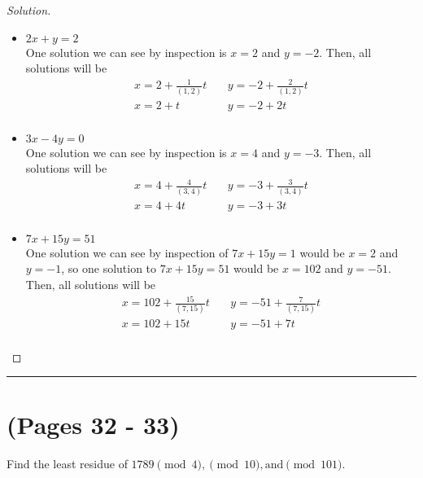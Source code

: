 \documentclass[11pt]{article}
\newcommand{\bline}{\noindent\rule[0.5ex]{\linewidth}{1pt}}
\newenvironment{problem}[2][Problem]{\begin{trivlist}
\item[\hskip \labelsep {\bfseries #1}\hskip \labelsep {\bfseries #2.}]}{\end{trivlist}}
\newenvironment{solution}
  {\renewcommand\qedsymbol{$~$}\begin{proof}[Solution]$ $\par\nobreak\ignorespaces}
  {\end{proof}}
\begin{document}
\begin{solution}
    \begin{itemize}
        \item [(a)] $2x+y=2$ \\
              One solution we can see by inspection is $x=2$ and $y=-2$. Then, all solutions will be
              \begin{align*}
                  x = 2 + \frac{1}{(1,2)}t & ~ & y = -2 + \frac{2}{(1,2)}t \\
                  x = 2 + t                & ~ & y = -2+ 2t                \\
              \end{align*}
        \item [(b)] $3x-4y=0$ \\
              One solution we can see by inspection is $x=4$ and $y=-3$. Then, all solutions will be
              \begin{align*}
                  x = 4 + \frac{4}{(3,4)}t & ~ & y = -3 + \frac{3}{(3,4)}t \\
                  x = 4 + 4t               & ~ & y = -3 + 3t               \\
              \end{align*}
        \item [(c)] $7x+15y=51$ \\
              One solution we can see by inspection of $7x+15y=1$ would be $x=2$ and $y=-1$, so one solution to $7x+15y=51$ would be $x=102$ and $y=-51$. Then, all solutions will be
              \begin{align*}
                  x = 102 + \frac{15}{(7,15)}t & ~ & y = -51 + \frac{7}{(7,15)}t \\
                  x = 102 + 15t                & ~ & y = -51 + 7t                \\
              \end{align*}

    \end{itemize}
\end{solution}


\bline
\section{(Pages 32 - 33)}

\begin{problem}{2}
Find the least residue of $1789 \pmod{4},\pmod{10},\text{and} \pmod{101}$.
\end{problem}
\end{document}
